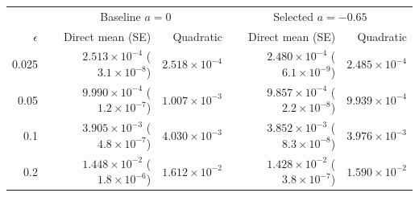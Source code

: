 \begin{tabular}{rrrrr}
\toprule
 & \multicolumn{2}{c}{Baseline $a=0$} & \multicolumn{2}{c}{Selected $a=-0.65$}\\
$\epsilon$ & Direct mean (SE) & Quadratic & Direct mean (SE) & Quadratic\\
\midrule
0.025 & $2.513\times10^{-4}$ ($3.1\times10^{-8}$) & $2.518\times10^{-4}$ & $2.480\times10^{-4}$ ($6.1\times10^{-9}$) & $2.485\times10^{-4}$\\
0.05 & $9.990\times10^{-4}$ ($1.2\times10^{-7}$) & $1.007\times10^{-3}$ & $9.857\times10^{-4}$ ($2.2\times10^{-8}$) & $9.939\times10^{-4}$\\
0.1 & $3.905\times10^{-3}$ ($4.8\times10^{-7}$) & $4.030\times10^{-3}$ & $3.852\times10^{-3}$ ($8.3\times10^{-8}$) & $3.976\times10^{-3}$\\
0.2 & $1.448\times10^{-2}$ ($1.8\times10^{-6}$) & $1.612\times10^{-2}$ & $1.428\times10^{-2}$ ($3.8\times10^{-7}$) & $1.590\times10^{-2}$\\
\bottomrule
\end{tabular}